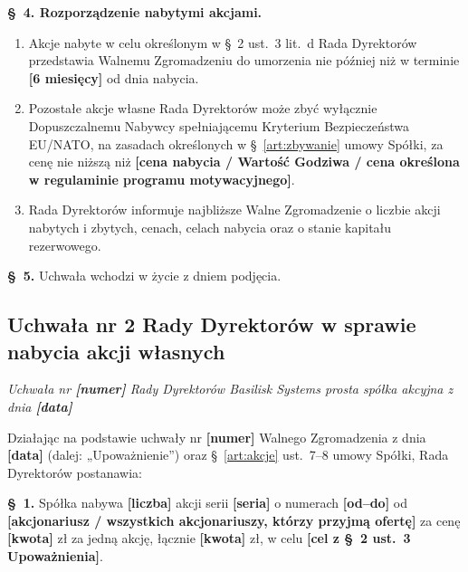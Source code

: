 \documentclass[12pt,a4paper]{report}
\newcommand{\field}[1]{\textbf{[#1]}}
\newcommand{\CompanyFull}{Basilisk Systems prosta spółka akcyjna}
\begin{document}
\textbf{§~4. Rozporządzenie nabytymi akcjami.}
\begin{enumerate}
  \item Akcje nabyte w celu określonym w §~2 ust.~3 lit.~d Rada Dyrektorów przedstawia Walnemu Zgromadzeniu do umorzenia nie później niż w terminie \field{6 miesięcy} od dnia nabycia.
  \item Pozostałe akcje własne Rada Dyrektorów może zbyć wyłącznie Dopuszczalnemu Nabywcy spełniającemu Kryterium Bezpieczeństwa EU/NATO, na zasadach określonych w §~\ref{art:zbywanie} umowy Spółki, za cenę nie niższą niż \field{cena nabycia / Wartość Godziwa / cena określona w regulaminie programu motywacyjnego}.
  \item Rada Dyrektorów informuje najbliższe Walne Zgromadzenie o liczbie akcji nabytych i zbytych, cenach, celach nabycia oraz o stanie kapitału rezerwowego.
\end{enumerate}

\textbf{§~5.} Uchwała wchodzi w życie z dniem podjęcia.

\subsection*{Uchwała nr 2 Rady Dyrektorów w sprawie nabycia akcji własnych}

\textit{Uchwała nr \field{numer} Rady Dyrektorów \CompanyFull{} z dnia \field{data}}

Działając na podstawie uchwały nr \field{numer} Walnego Zgromadzenia z dnia \field{data} (dalej: „Upoważnienie”) oraz §~\ref{art:akcje} ust.~7--8 umowy Spółki, Rada Dyrektorów postanawia:

\textbf{§~1.} Spółka nabywa \field{liczba} akcji serii \field{seria} o numerach \field{od--do} od \field{akcjonariusz / wszystkich akcjonariuszy, którzy przyjmą ofertę} za cenę \field{kwota} zł za jedną akcję, łącznie \field{kwota} zł, w celu \field{cel z §~2 ust.~3 Upoważnienia}.
\end{document}
